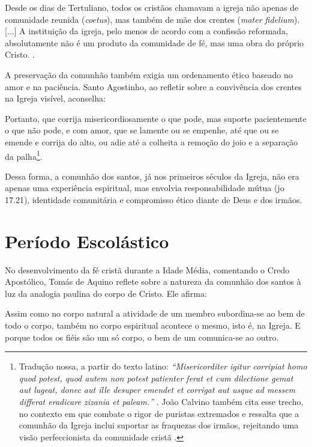 \begin{citacao}
    Desde os dias de Tertuliano, todos os cristãos chamavam a igreja não apenas de comunidade reunida (\textit{coetus}), mas também de mãe dos crentes (\textit{mater fidelium}). [...] A instituição da igreja, pelo menos de acordo com a confissão reformada, absolutamente não é um produto da comunidade de fé, mas uma obra do próprio Cristo. \cite[p.~335]{bavinck2012}.
\end{citacao}

A preservação da comunhão também exigia um ordenamento ético baseado no amor e na paciência. Santo Agostinho, ao refletir sobre a convivência dos crentes na Igreja visível, aconselha:

\begin{citacao}
    Portanto, que corrija misericordiosamente o que pode, mas suporte pacientemente o que não pode, e com amor, que se lamente ou se empenhe, até que ou se emende e corrija do alto, ou adie até a colheita a remoção do joio e a separação da palha\footnote{Tradução nossa, a partir do texto latino: \textit{``\foreignlanguage{latin}{Misericorditer igitur corripiat homo quod potest, quod autem non potest patienter ferat et cum dilectione gemat aut lugeat, donec aut ille desuper emendet et corrigat aut usque ad messem differat eradicare zizania et paleam.}''} \cite[livro~III, capítulo~1, seção~15]{agostinhoContraParmeniani}. João Calvino também cita esse trecho, no contexto em que combate o rigor de puristas extremados e ressalta que a comunhão da Igreja inclui suportar as fraquezas dos irmãos, rejeitando uma visão perfeccionista da comunidade cristã \cite[v.~4, cap.~1, seção~16, p.~1887]{calvino2022}.}.
\end{citacao}

Dessa forma, a comunhão dos santos, já nos primeiros séculos da Igreja, não era apenas uma experiência espiritual, mas envolvia responsabilidade mútua (\gls{jo} 17.21), identidade comunitária e compromisso ético diante de Deus e dos irmãos.

\section{Período Escolástico}

No desenvolvimento da fé cristã durante a Idade Média, comentando o Credo Apostólico, Tomás de Aquino reflete sobre a natureza da comunhão dos santos à luz da analogia paulina do corpo de Cristo. Ele afirma:

\begin{citacao}
    Assim como no corpo natural a atividade de um membro subordina-se ao bem de todo o corpo, também no corpo espiritual acontece o mesmo, isto é, na Igreja. E porque todos os fiéis são um só corpo, o bem de um comunica-se ao outro. \cite[p.~79]{aquinoCredo2004}
\end{citacao}

